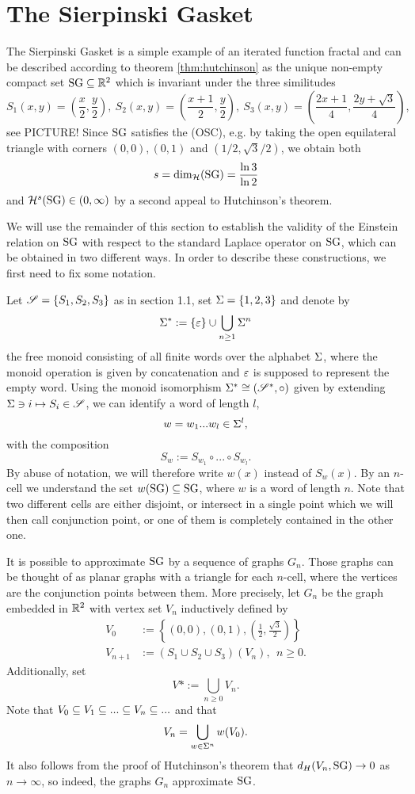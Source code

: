 \section{The Sierpinski Gasket}

The Sierpinski Gasket is a simple example of an iterated function fractal and can be described according to theorem \ref{thm:hutchinson} as the unique non-empty compact set $\operatorname{SG}\subseteq\mathbb{R}^2$ which is invariant under the three similitudes 
\[
  S_1(x,y)=\left(\frac{x}{2},\frac{y}{2}\right),\ 
  S_2(x,y)=\left(\frac{x+1}{2},\frac{y}{2}\right),\ 
  S_3(x,y)=\left(\frac{2x+1}{4},\frac{2y+\sqrt{3}}{4}\right),
\]
see PICTURE! Since $\operatorname{SG}$ satisfies the (OSC), e.g. by taking the open equilateral triangle with corners $(0,0), (0,1)$ and $(1/2,\sqrt{3}/2)$, we obtain both 
\begin{equation}\label{eq:SGdimh}
  s=\dim_{\mathcal{H}}(\operatorname{SG})=\frac{\ln 3}{\ln 2}
\end{equation}
and $\mathcal{H}^s(\operatorname{SG})\in(0,\infty)$ by a second appeal to Hutchinson's theorem. 

We will use the remainder of this section to establish the validity of the Einstein relation on $\operatorname{SG}$ with respect to the standard Laplace operator on $\operatorname{SG}$, which can be obtained in two different ways. In order to describe these constructions, we first need to fix some notation. 

Let $\mathscr{S}=\{S_1,S_2,S_3\}$ as in section 1.1, set $\Sigma=\{1,2,3\}$ and denote by 
\[
  \Sigma^*:=\{\varepsilon\}\cup\bigcup_{n\geq 1}\Sigma^n
\]
the free monoid consisting of all finite words over the alphabet $\Sigma$, where the monoid operation is given by concatenation and $\varepsilon$ is supposed to represent the empty word. Using the monoid isomorphism 
$\Sigma^*\cong (\mathscr{S}^*,\circ)$ given by extending 
$\Sigma\ni i\mapsto S_i\in\mathscr{S}$, we can identify a word of length $l$,
\[
  w=w_1...w_l\in\Sigma^l,
\]
with the composition 
\[
  S_w:=S_{w_1}\circ...\circ S_{w_l}.
\]
By abuse of notation, we will therefore write $w(x)$ instead of $S_w(x)$. By an $n$-cell we understand the set $w(\operatorname{SG})\subseteq\operatorname{SG}$, where $w$ is a word of length $n$. Note that two different cells are either disjoint, or intersect in a single point which we will then call conjunction point, or one of them is completely contained in the other one. 

It is possible to approximate $\operatorname{SG}$ by a sequence of graphs $G_n$. Those graphs can be thought of as planar graphs with a triangle for each $n$-cell, where the vertices are the conjunction points between them. More precisely, let $G_n$ be the graph embedded in $\mathbb{R}^2$ with vertex set $V_n$ inductively defined by
\begin{align*}
  V_0&:=
  \left\{(0,0),(0,1),\left(\frac{1}{2},\frac{\sqrt{3}}{2}\right)\right\}\\
  V_{n+1}&:=(S_1\cup S_2\cup S_3)(V_n),\ \ n\geq0.
\end{align*}
Additionally, set 
\[
  V*:=\bigcup_{n\geq0} V_n.
\]
Note that $V_0\subseteq V_1\subseteq...\subseteq V_n\subseteq ...$ and that
\[
  V_n=\bigcup_{w\in\Sigma^n} w(V_0).
\]
It also follows from the proof of Hutchinson's theorem that 
$d_H(V_n,\operatorname{SG})\to 0$ as $n\to\infty$, so indeed, the graphs $G_n$ approximate $\operatorname{SG}$. 


